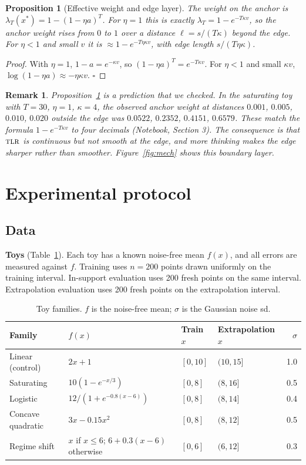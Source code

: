 \documentclass[10pt]{article}
\newtheorem{proposition}{Proposition}
\newtheorem{remark}{Remark}
\newcommand{\TLR}{\textsc{tlr}}
\begin{document}
\begin{proposition}[Effective weight and edge layer]\label{prop:edge}
The weight on the anchor is $\lambda_T(x^*)=1-(1-\eta a)^T$. For $\eta=1$ this is exactly $\lambda_T=1-e^{-T\kappa v}$, so the anchor weight rises from $0$ to $1$ over a distance $\ell=s/(T\kappa)$ beyond the edge. For $\eta<1$ and small $v$ it is $\approx 1-e^{-T\eta\kappa v}$, with edge length $s/(T\eta\kappa)$.
\end{proposition}
\begin{proof}
With $\eta=1$, $1-a=e^{-\kappa v}$, so $(1-\eta a)^T=e^{-T\kappa v}$. For $\eta<1$ and small $\kappa v$, $\log(1-\eta a)\approx-\eta\kappa v$. $\square$
\end{proof}

\begin{remark}
Proposition~\ref{prop:edge} is a prediction that we checked. In the saturating toy with $T=30$, $\eta=1$, $\kappa=4$, the observed anchor weight at distances $0.001$, $0.005$, $0.010$, $0.020$ outside the edge was $0.0522$, $0.2352$, $0.4151$, $0.6579$. These match the formula $1-e^{-T\kappa v}$ to four decimals (Notebook, Section 3). The consequence is that $\TLR$ is continuous but not smooth at the edge, and more thinking makes the edge sharper rather than smoother. Figure~\ref{fig:mech} shows this boundary layer.
\end{remark}

\section{Experimental protocol}
\subsection{Data}
\textbf{Toys} (Table~\ref{tab:toys}). Each toy has a known noise-free mean $f(x)$, and all errors are measured against $f$. Training uses $n=200$ points drawn uniformly on the training interval. In-support evaluation uses 200 fresh points on the same interval. Extrapolation evaluation uses 200 fresh points on the extrapolation interval.

\begin{table}[h]
\centering
\caption{Toy families. $f$ is the noise-free mean; $\sigma$ is the Gaussian noise sd.}\label{tab:toys}
\begin{tabular}{llllr}
\toprule
Family & $f(x)$ & Train $x$ & Extrapolation $x$ & $\sigma$\\
\midrule
Linear (control) & $2x+1$ & $[0,10]$ & $(10,15]$ & 1.0\\
Saturating & $10(1-e^{-x/3})$ & $[0,8]$ & $(8,16]$ & 0.5\\
Logistic & $12/(1+e^{-0.8(x-6)})$ & $[0,8]$ & $(8,14]$ & 0.4\\
Concave quadratic & $3x-0.15x^2$ & $[0,8]$ & $(8,12]$ & 0.5\\
Regime shift & $x$ if $x\le6$; $6+0.3(x-6)$ otherwise & $[0,6]$ & $(6,12]$ & 0.3\\
\bottomrule
\end{tabular}
\end{table}
\end{document}
